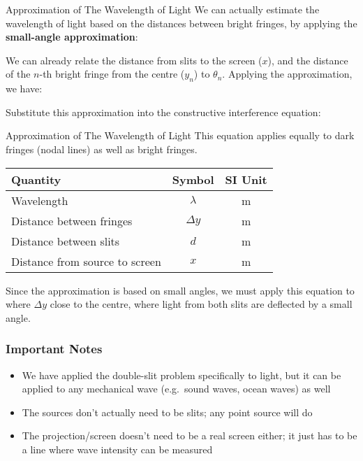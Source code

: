\documentclass[compress,aspectratio=169]{beamer}
\newcommand{\eq}[2]{\vspace{#1}{\LARGE\begin{displaymath}#2\end{displaymath}}}
\begin{document}
\begin{frame}{Approximation of The Wavelength of Light}
  We can actually estimate the wavelength of light based on the distances
  between bright fringes, by applying the \textbf{small-angle approximation}:
  
  \eq{-.3in}{
    \theta\approx\tan\theta\approx\sin\theta
  }
  
  \vspace{-.15in}We can already relate the distance from slits to the screen
  ($x$), and the distance of the $n$-th bright fringe from the centre ($y_n$)
  to $\theta_n$. Applying the approximation, we have:

  \eq{-.2in}{
    \tan\theta_n=\frac{y_n}{x}\approx\sin\theta_n
  }

  Substitute this approximation into the constructive interference equation:

  \eq{-.2in}{
    n\lambda\approx\frac{y_nd}{x}
    \quad\longrightarrow\quad
    \boxed{\lambda\approx\frac{\Delta y d}{x}}
  }
\end{frame}



\begin{frame}{Approximation of The Wavelength of Light}
  This equation applies equally to dark fringes (nodal lines) as well as bright
  fringes.
  
  \eq{-.2in}{
    \boxed{\lambda\approx\frac{\Delta y d}{x}}
  }
  \begin{center}
    \begin{tabular}{l|c|c}
      \rowcolor{pink}
      \textbf{Quantity} & \textbf{Symbol} & \textbf{SI Unit} \\ \hline
      Wavelength                     & $\lambda$  & \si{\metre} \\
      Distance between fringes       & $\Delta y$ & \si{\metre} \\
      Distance between slits         & $d$        & \si{\metre} \\
      Distance from source to screen & $x$        & \si{\metre}
    \end{tabular}
  \end{center}
  Since the approximation is based on small angles, we must apply this equation
  to where $\Delta y$ close to the centre, where light from both slits are
  deflected by a small angle.
\end{frame}


\begin{frame}
  \frametitle{Important Notes}
  \begin{itemize}
  \item We have applied the double-slit problem specifically to light, but it
    can be applied to any mechanical wave (e.g.\ sound waves, ocean waves) as
    well
  \item The sources don't actually need to be slits; any point source will do
  \item The projection/screen doesn't need to be a real screen either; it just
    has to be a line where wave intensity can be measured
  \end{itemize}
\end{frame}
\end{document}
